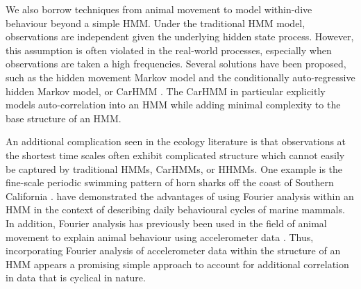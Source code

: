 %

We also borrow techniques from animal movement to model within-dive behaviour beyond a simple HMM.  
Under the traditional HMM model, observations are independent given the underlying hidden state process.
However, this assumption is often violated in the real-world processes, especially when observations are taken a high frequencies. 
Several solutions have been proposed, such as the hidden movement Markov model \citep{Whoriskey:2016} and the conditionally auto-regressive hidden Markov model, or CarHMM \citep{Lawler:2019}. 
The CarHMM in particular explicitly models auto-correlation into an HMM while adding minimal complexity to the base structure of an HMM.

An additional complication seen in the ecology literature is that observations at the shortest time scales often exhibit complicated structure which cannot easily be captured by traditional HMMs, CarHMMs, or HHMMs. One example is the fine-scale periodic swimming pattern of horn sharks off the coast of Southern California \citep{Adam:2019}.
\cite{Heerah:2017} have demonstrated the advantages of using Fourier analysis within an HMM in the context of describing daily behavioural cycles of marine mammals.
In addition, Fourier analysis has previously been used in the field of animal movement to explain animal behaviour using accelerometer data \citep{Fehlmann:2017,Shorter:2017}.
Thus, incorporating Fourier analysis of accelerometer data within the structure of an HMM appears a promising simple approach to account for additional correlation in data that is cyclical in nature.

